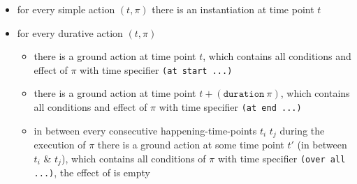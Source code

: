 \begin{isabellebody}
\begin{isamarkuptext}
%
\begin{itemize}%
\item for every simple action $(t,\pi)$ there is an instantiation at time point $t$

\item for every durative action $(t,\pi)$

%
\begin{itemize}%
\item there is a ground action at time point $t$, 
which contains all conditions and effect of $\pi$ with time specifier \texttt{(at start ...)}

\item there is a ground action at time point $t + (\texttt{duration}\ \pi)$, 
which contains all conditions and effect of $\pi$ with time specifier \texttt{(at end ...)}

\item in between every consecutive happening-time-points $t_i$ $t_j$ during the execution of $\pi$
there is a ground action at some time point $t'$ (in between $t_i$ \& $t_j$), 
which contains all conditions of $\pi$ with time specifier \texttt{(over all ...)}, the effect of is empty%
\end{itemize}


\end{itemize}
\end{isamarkuptext}
\end{isabellebody}
